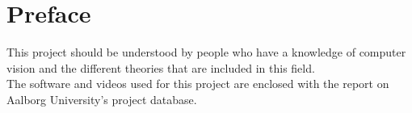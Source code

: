 \section*{Preface}
This project should be understood by people who have a knowledge of computer vision and the different theories that are included in this field.\\
The software and videos used for this project are enclosed with the report on Aalborg University's project database.\\

